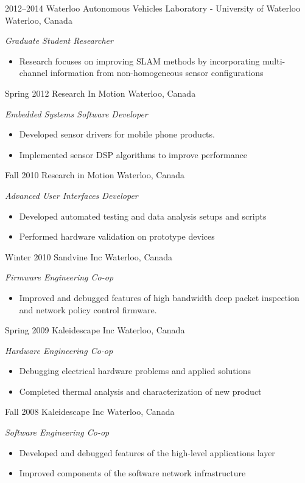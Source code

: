 \documentclass[stdletter]{friggeri-cv} %
\begin{document}
\begin{entrylist}
\entry
{2012--2014}
{Waterloo Autonomous Vehicles Laboratory - University of Waterloo}
{Waterloo, Canada}
{\emph{Graduate Student Researcher} 
\begin{itemize}
    \item Research focuses on improving SLAM methods by incorporating multi-channel information from non-homogeneous sensor configurations
\end{itemize} }
\entry
{Spring 2012}
{Research In Motion}
{Waterloo, Canada}
{\emph{Embedded Systems Software Developer} 
\begin{itemize}
    \item Developed sensor drivers for mobile phone products. 
    \item Implemented sensor DSP algorithms to improve performance
\end{itemize} }
\entry
{Fall 2010}
{Research in Motion}
{Waterloo, Canada}
{\emph{Advanced User Interfaces Developer} 
\begin{itemize}
    \item Developed automated testing and data analysis setups and scripts
    \item Performed hardware validation on prototype devices
\end{itemize} }
\entry
{Winter 2010}
{Sandvine Inc}
{Waterloo, Canada}
{\emph{Firmware Engineering Co-op}
\begin{itemize}
    \item Improved and debugged features of high bandwidth deep packet inspection and network policy control firmware.
\end{itemize} }
\entry
{Spring 2009}
{Kaleidescape Inc}
{Waterloo, Canada}
{\emph{Hardware Engineering Co-op}
\begin{itemize}
    \item Debugging electrical hardware problems and applied solutions
    \item Completed thermal analysis and characterization of new product
\end{itemize} }
\entry
{Fall 2008}
{Kaleidescape Inc}
{Waterloo, Canada}
{\emph{Software Engineering Co-op}
\begin{itemize}
    \item Developed and debugged features of the high-level applications layer
    \item Improved components of the software network infrastructure
\end{itemize} }
\end{entrylist}
\end{document}
